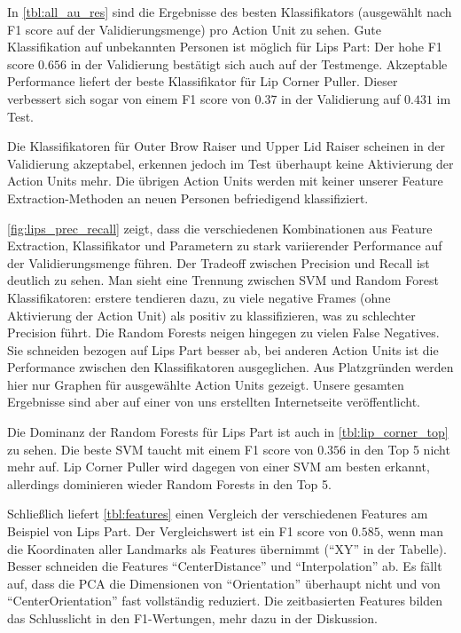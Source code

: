 

In \cref{tbl:all_au_res} sind die Ergebnisse des besten Klassifikators
(ausgewählt nach F1 score auf der Validierungsmenge) pro Action Unit zu sehen.
Gute Klassifikation auf unbekannten Personen ist möglich für Lips Part: Der hohe
F1 score $0.656$ in der Validierung bestätigt sich auch auf der Testmenge. Akzeptable
Performance liefert der beste Klassifikator für Lip Corner Puller. Dieser
verbessert sich sogar von einem F1 score von $0.37$ in der Validierung auf
$0.431$ im Test.

Die Klassifikatoren für Outer Brow Raiser und Upper Lid Raiser scheinen in der
Validierung akzeptabel, erkennen jedoch im Test überhaupt keine Aktivierung der
Action Units mehr. Die übrigen Action Units werden mit keiner unserer Feature
Extraction-Methoden an neuen Personen befriedigend klassifiziert.

\cref{fig:lips_prec_recall} zeigt, dass die verschiedenen Kombinationen aus
Feature Extraction, Klassifikator und Parametern zu stark variierender
Performance auf der Validierungsmenge führen. Der Tradeoff zwischen Precision
und Recall ist deutlich zu sehen. Man sieht eine Trennung zwischen SVM und
Random Forest Klassifikatoren: erstere tendieren dazu, zu viele negative Frames
(ohne Aktivierung der Action Unit) als positiv zu klassifizieren, was zu
schlechter Precision führt. Die Random Forests neigen hingegen zu vielen False
Negatives. Sie schneiden bezogen auf Lips Part besser ab, bei anderen Action
Units ist die Performance zwischen den Klassifikatoren ausgeglichen.
Aus Platzgründen werden hier nur Graphen für ausgewählte Action Units gezeigt.
Unsere gesamten Ergebnisse sind aber auf einer von uns
erstellten Internetseite veröffentlicht.



Die Dominanz der Random Forests für Lips Part ist auch in
\cref{tbl:lip_corner_top} zu sehen. Die beste SVM taucht mit einem F1 score von
$0.356$ in den Top 5 nicht mehr auf. Lip Corner Puller wird dagegen von einer
SVM am besten erkannt, allerdings dominieren wieder Random Forests in den Top 5.


Schließlich liefert \cref{tbl:features} einen Vergleich der verschiedenen
Features am Beispiel von Lips Part. Der Vergleichswert ist ein F1 score von
$0.585$, wenn man die Koordinaten aller Landmarks als Features übernimmt (``XY''
in der Tabelle). Besser schneiden die Features ``CenterDistance'' und
``Interpolation'' ab. Es fällt auf, dass die PCA die Dimensionen von
``Orientation'' überhaupt nicht und von ``CenterOrientation'' fast vollständig reduziert. Die zeitbasierten Features bilden das Schlusslicht in den
F1-Wertungen, mehr dazu in der Diskussion.

